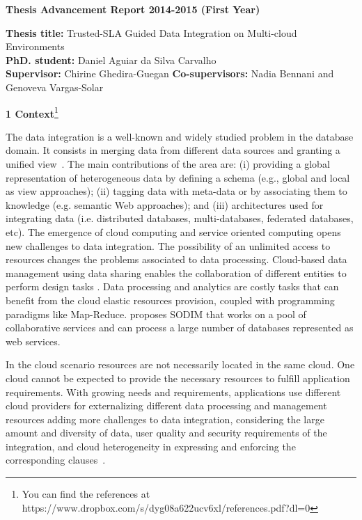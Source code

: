 \documentclass[11pt,a4paper,oneside]{report}
\author{Daniel Aguiar da Silva Carvalho}
\begin{document}
\sffamily
\begin{center}
\textbf{\large{Thesis Advancement Report 2014-2015 (First Year)}}
\end{center}

\begin{flushleft}
\textbf{Thesis title:} Trusted-SLA Guided Data Integration on Multi-cloud Environments \\
\textbf{PhD. student:} Daniel Aguiar da Silva Carvalho \\
\textbf{Supervisor:} Chirine Ghedira-Guegan \textbf{Co-supervisors:} Nadia Bennani and Genoveva Vargas-Solar 
\end{flushleft}

\begin{flushleft}
\textbf{1 Context}\footnote{You can find the references at https://www.dropbox.com/s/dyg08a622ucv6xl/references.pdf?dl=0} \\
\end{flushleft} 
The data integration is a well-known and widely studied problem in the database domain. 
It consists in merging data from different data sources and granting a unified view~\cite{Lenzerini:2002}. 
%
The main contributions of the area are: (i) providing a global  representation of heterogeneous data  by defining a schema (e.g., global and local as view approaches); (ii) tagging data with meta-data or by associating them to knowledge (e.g. semantic Web approaches); and (iii)   architectures used for integrating data (i.e. distributed databases, multi-databases,  federated databases, etc).
%
The emergence of cloud computing and service oriented computing opens new challenges to data integration. 
The possibility of an unlimited access to resources  changes the problems associated to data processing. Cloud-based data management using data sharing  enables the collaboration of different entities to perform design tasks \cite{Gonzalez:2010,Gonzalez:2010b}. Data processing and analytics are costly tasks that can benefit from the cloud elastic resources provision, coupled with  programming paradigms like Map-Reduce. \cite{078} proposes SODIM that works on a pool of collaborative services and can process a large number of databases represented as web services. 


In the cloud scenario resources are not necessarily located in the same cloud. One cloud cannot be expected to provide the necessary resources to fulfill application requirements. 
With growing needs and requirements, applications use different cloud providers for externalizing different data processing and management resources
adding more challenges to data integration, considering the large amount and diversity of data, user quality and security requirements of the integration, and cloud heterogeneity in expressing and enforcing the corresponding clauses~\cite{Dustdar:2012}.
\end{document}
